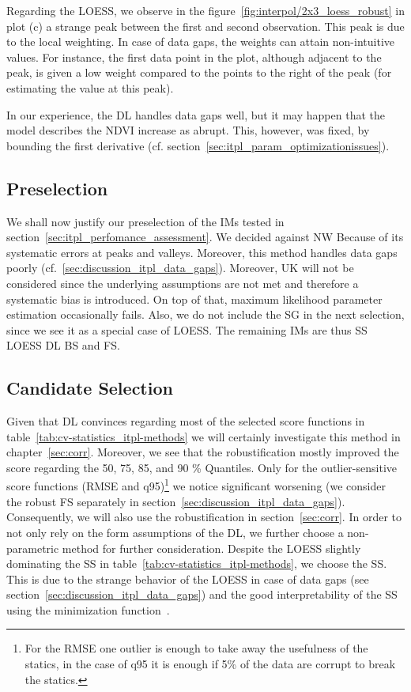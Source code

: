 {{        Regarding the LOESS, we observe in the figure~\ref{fig:interpol/2x3_loess_robust} in plot (c) a strange peak between the first and second observation. This peak is due to the local weighting. In case of data gaps, the weights can attain non-intuitive values. For instance, the first data point in the plot, although adjacent to the peak, is given a low weight compared to the points to the right of the peak (for estimating the value at this peak).

        In our experience, the DL handles data gaps well, but it may happen that the model describes the NDVI increase as abrupt. This, however, was fixed, by bounding the first derivative (cf. section~\ref{sec:itpl_param_optimizationissues}).
    }

    \subsection{Preselection}{\label{sec:itpl_preselection}
        We shall now justify our preselection of the {{IM}}s tested in section~\ref{sec:itpl_perfomance_assessment}. 
        We decided against NW Because of its systematic errors at peaks and valleys. Moreover, this method handles data gaps poorly (cf.~\ref{sec:discussion_itpl_data_gaps}). 
        Moreover, UK will not be considered since the underlying assumptions are not met and therefore a systematic bias is introduced. On top of that, maximum likelihood parameter estimation occasionally fails.
        Also, we do not include the SG in the next selection, since we see it as a special case of LOESS.
        The remaining IMs are thus SS LOESS DL BS and FS.
    }

    \subsection{Candidate Selection}{\label{sec:itpl_candiate_selection}
        Given that DL convinces regarding most of the selected score functions in table~\ref{tab:cv-statistics_itpl-methods} we will certainly investigate this method in chapter~\ref{sec:corr}. Moreover, we see that the robustification mostly improved the score regarding the 50, 75, 85, and 90 \% Quantiles. Only for the outlier-sensitive score functions (RMSE and q95)\footnote{For the RMSE one outlier is enough to take away the usefulness of the statics, in the case of q95 it is enough if 5\% of the data are corrupt to break the statics.} we notice significant worsening (we consider the robust FS separately in section~\ref{sec:discussion_itpl_data_gaps}). Consequently, we will also use the robustification in section~\ref{sec:corr}.
        In order to not only rely on the form assumptions of the DL, we further choose a non-parametric method for further consideration. Despite the LOESS slightly dominating the SS in table~\ref{tab:cv-statistics_itpl-methods}, we choose the SS. This is due to the strange behavior of the LOESS in case of data gaps (see section~\ref{sec:discussion_itpl_data_gaps}) and the good interpretability of the SS using the minimization function~.
    }
}


